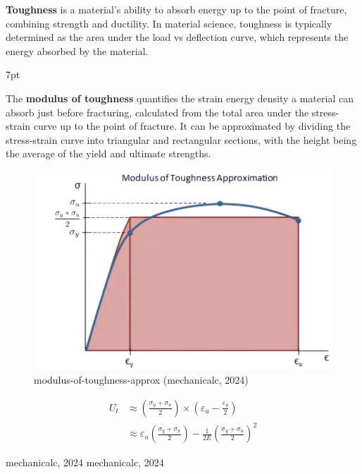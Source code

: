 \documentclass{article}
\newcommand{\formalsource}{} %
\newenvironment{formal}[1][]{%
	\renewcommand{\formalsource}{#1}%
	\def\FrameCommand{%
		\hspace{1pt}%
		{\color{gray}\vrule width 2pt}%
		{\color{white}\vrule width 4pt}%
		\colorbox{white}%
	}%
	\MakeFramed{\advance\hsize-\width\FrameRestore}%
	\noindent\hspace{-4.55pt}%
	\begin{adjustwidth}{}{7pt}%
		\vspace{2pt}%
	}%
	{%
		\vspace{4pt}%
		\ifx\formalsource\empty %
		\else
		\hfill{\footnotesize{\formalsource}}%
		\fi
	\end{adjustwidth}\endMakeFramed%
}
\begin{document}
{\textbf{Toughness} is a material's ability to absorb energy up to the point of fracture, combining strength and ductility. In material science, toughness is typically determined as the area under the load vs deflection curve, which represents the energy absorbed by the material.\\[8pt]
\begin{formal}[mechanicalc, 2024]
    The \textbf{modulus of toughness} quantifies the strain energy density a material can absorb just before fracturing, calculated from the total area under the stress-strain curve up to the point of fracture. It can be approximated by dividing the stress-strain curve into triangular and rectangular sections, with the height being the average of the yield and ultimate strengths.
\begin{center}
    \begin{minipage}{0.5\textwidth}\centering
        \begin{figure}[H]
            \centering
            \includegraphics[width=1\textwidth]{images/modulus-of-toughness-approx-01(1).jpg}
            \caption{modulus-of-toughness-approx (mechanicalc, 2024)}
            \label{fig:mot}
        \end{figure}
    \end{minipage}\hfil
    \begin{minipage}{0.45\textwidth}
        \begin{equation}
            \begin{aligned}
                U_t &\approx \left(\frac{\sigma_{y} + \sigma_{u}}{2}\right)\times\left(\varepsilon_u - \frac{\varepsilon_y}{2}\right)\\
                &\approx \varepsilon_u\left(\frac{\sigma_{y} + \sigma_{u}}{2}\right) -\frac{1}{2E}\left(\frac{\sigma_{y} + \sigma_{u}}{2}\right)^2

\end{aligned}
\end{equation}
\end{minipage}
\end{center}
\end{formal}}
\end{document}
